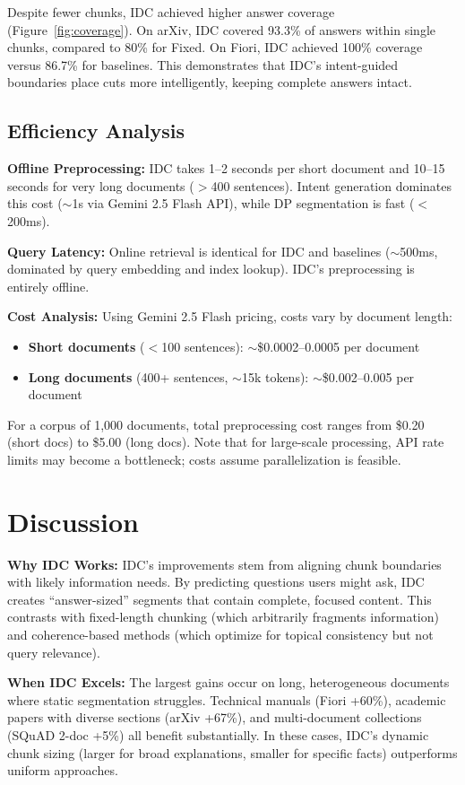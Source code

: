 \documentclass[conference]{IEEEtran}
\begin{document}
Despite fewer chunks, IDC achieved higher answer coverage (Figure~\ref{fig:coverage}). On arXiv, IDC covered 93.3\% of answers within single chunks, compared to 80\% for Fixed. On Fiori, IDC achieved 100\% coverage versus 86.7\% for baselines. This demonstrates that IDC's intent-guided boundaries place cuts more intelligently, keeping complete answers intact.

\subsection{Efficiency Analysis}

\textbf{Offline Preprocessing:} IDC takes 1--2 seconds per short document and 10--15 seconds for very long documents ($>$400 sentences). Intent generation dominates this cost ($\sim$1s via Gemini 2.5 Flash API), while DP segmentation is fast ($<$200ms).

\textbf{Query Latency:} Online retrieval is identical for IDC and baselines ($\sim$500ms, dominated by query embedding and index lookup). IDC's preprocessing is entirely offline.

\textbf{Cost Analysis:} Using Gemini 2.5 Flash pricing, costs vary by document length:
\begin{itemize}
    \item \textbf{Short documents} ($<$100 sentences): $\sim$\$0.0002--0.0005 per document
    \item \textbf{Long documents} (400+ sentences, $\sim$15k tokens): $\sim$\$0.002--0.005 per document
\end{itemize}
For a corpus of 1,000 documents, total preprocessing cost ranges from \$0.20 (short docs) to \$5.00 (long docs). Note that for large-scale processing, API rate limits may become a bottleneck; costs assume parallelization is feasible.

\section{Discussion}

\textbf{Why IDC Works:} IDC's improvements stem from aligning chunk boundaries with likely information needs. By predicting questions users might ask, IDC creates ``answer-sized'' segments that contain complete, focused content. This contrasts with fixed-length chunking (which arbitrarily fragments information) and coherence-based methods (which optimize for topical consistency but not query relevance).

\textbf{When IDC Excels:} The largest gains occur on long, heterogeneous documents where static segmentation struggles. Technical manuals (Fiori +60\%), academic papers with diverse sections (arXiv +67\%), and multi-document collections (SQuAD 2-doc +5\%) all benefit substantially. In these cases, IDC's dynamic chunk sizing (larger for broad explanations, smaller for specific facts) outperforms uniform approaches.
\end{document}
